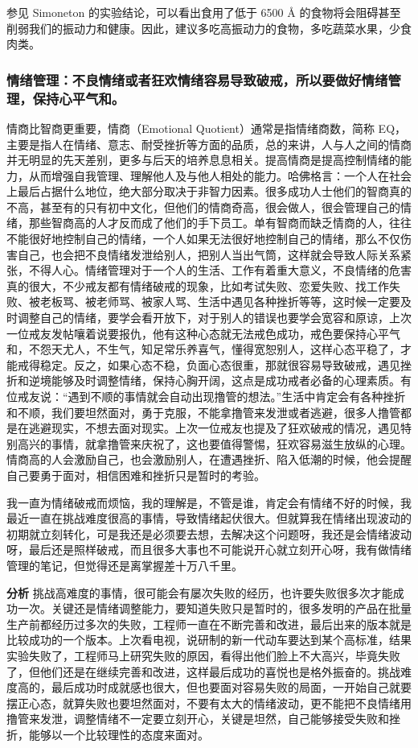 参见 Simoneton 的实验结论，可以看出食用了低于 6500 \unit{\angstrom} 的食物将会阻碍甚至削弱我们的振动力和健康。因此，建议多吃高振动力的食物，多吃蔬菜水果，少食肉类。

\subsubsection{情绪管理：不良情绪或者狂欢情绪容易导致破戒，所以要做好情绪管理，保持心平气和。}

情商比智商更重要，情商（Emotional Quotient）通常是指情绪商数，简称 EQ，主要是指人在情绪、意志、耐受挫折等方面的品质，总的来讲，人与人之间的情商并无明显的先天差别，更多与后天的培养息息相关。提高情商是提高控制情绪的能力，从而增强自我管理、理解他人及与他人相处的能力。哈佛格言：一个人在社会上最后占据什么地位，绝大部分取决于非智力因素。很多成功人士他们的智商真的不高，甚至有的只有初中文化，但他们的情商奇高，很会做人，很会管理自己的情绪，那些智商高的人才反而成了他们的手下员工。单有智商而缺乏情商的人，往往不能很好地控制自己的情绪，一个人如果无法很好地控制自己的情绪，那么不仅伤害自己，也会把不良情绪发泄给别人，把别人当出气筒，这样就会导致人际关系紧张，不得人心。情绪管理对于一个人的生活、工作有着重大意义，不良情绪的危害真的很大，不少戒友都有情绪破戒的现象，比如考试失败、恋爱失败、找工作失败、被老板骂、被老师骂、被家人骂、生活中遇见各种挫折等等，这时候一定要及时调整自己的情绪，要学会看开放下，对于别人的错误也要学会宽容和原谅，上次一位戒友发帖嚷着说要报仇，他有这种心态就无法戒色成功，戒色要保持心平气和，不怨天尤人，不生气，知足常乐养喜气，懂得宽恕别人，这样心态平稳了，才能戒得稳定。反之，如果心态不稳，负面心态很重，那就很容易导致破戒，遇见挫折和逆境能够及时调整情绪，保持心胸开阔，这点是成功戒者必备的心理素质。有位戒友说：“遇到不顺的事情就会自动出现撸管的想法。”生活中肯定会有各种挫折和不顺，我们要坦然面对，勇于克服，不能拿撸管来发泄或者逃避，很多人撸管都是在逃避现实，不想去面对现实。上次一位戒友也提及了狂欢破戒的情况，遇见特别高兴的事情，就拿撸管来庆祝了，这也要值得警惕，狂欢容易滋生放纵的心理。情商高的人会激励自己，也会激励别人，在遭遇挫折、陷入低潮的时候，他会提醒自己要勇于面对，相信困难和挫折只是暂时的考验。

\begin{case}[情绪管理]
    我一直为情绪破戒而烦恼，我的理解是，不管是谁，肯定会有情绪不好的时候，我最近一直在挑战难度很高的事情，导致情绪起伏很大。但就算我在情绪出现波动的初期就立刻转化，可是我还是必须要去想，去解决这个问题呀，我还是会情绪波动呀，最后还是照样破戒，而且很多大事也不可能说开心就立刻开心呀，我有做情绪管理的笔记，但觉得还是离掌握差十万八千里。

    \textbf{分析} 挑战高难度的事情，很可能会有屡次失败的经历，也许要失败很多次才能成功一次。关键还是情绪调整能力，要知道失败只是暂时的，很多发明的产品在批量生产前都经历过多次的失败，工程师一直在不断完善和改进，最后出来的版本就是比较成功的一个版本。上次看电视，说研制的新一代动车要达到某个高标准，结果实验失败了，工程师马上研究失败的原因，看得出他们脸上不大高兴，毕竟失败了，但他们还是在继续完善和改进，这样最后成功的喜悦也是格外振奋的。挑战难度高的，最后成功时成就感也很大，但也要面对容易失败的局面，一开始自己就要摆正心态，就算失败也要坦然面对，不要有太大的情绪波动，更不能把不良情绪用撸管来发泄，调整情绪不一定要立刻开心，关键是坦然，自己能够接受失败和挫折，能够以一个比较理性的态度来面对。
\end{case}

